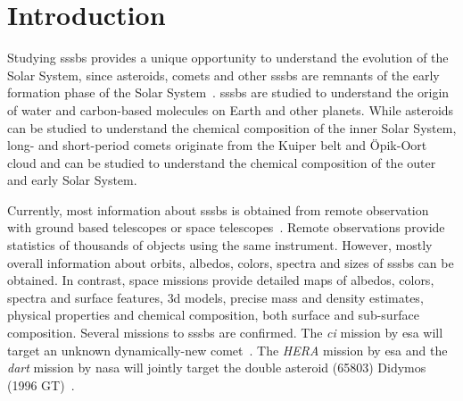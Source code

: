 \section{Introduction} \label{sec:introduction}




Studying \glspl{sssb} provides a unique opportunity to understand the evolution of the Solar System, since asteroids, comets and other \glspl{sssb} are remnants of the early formation phase of the Solar System~\cite{walsh2018rubble, a2017comets}. \glspl{sssb} are studied to understand the origin of water and carbon-based molecules on Earth and other planets. While asteroids can be studied to understand the chemical composition of the inner Solar System, long- and short-period comets originate from the Kuiper belt and \"Opik-Oort cloud and can be studied to understand the chemical composition of the outer and early Solar System.

Currently, most information about \glspl{sssb} is obtained from remote observation with ground based telescopes or space telescopes~\cite{bowles2018castaway}. Remote observations provide statistics of thousands of objects using the same instrument. However, mostly overall information about orbits, albedos, colors, spectra and sizes of \glspl{sssb} can be obtained. In contrast, space missions provide detailed maps of albedos, colors, spectra and surface features, \gls{3d} models, precise mass and density estimates, physical properties and chemical composition, both surface and sub-surface composition. Several missions to \glspl{sssb} are confirmed. The \textit{\gls{ci}} mission by \gls{esa} will target an unknown dynamically-new comet~\cite{snodgrass2019europeanCI}. The \textit{HERA} mission by \gls{esa} and the \textit{\gls{dart}} mission by \gls{nasa} will jointly target the double asteroid (65803) Didymos (1996 GT)~\cite{hera, talbert_2017DART}.

